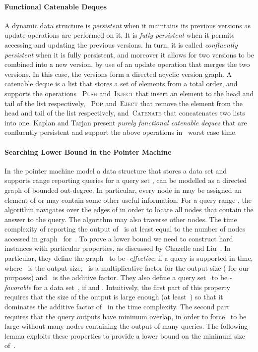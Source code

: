 \documentclass[]{article}
\begin{document}
\paragraph{Functional Catenable Deques}

A dynamic data structure is \textit{persistent} when it maintains its previous
versions as update operations are performed on it. It is \textit{fully
persistent} when it permits accessing and updating the previous versions. In
turn, it is called \textit{confluently persistent} when it is fully persistent,
and moreover it allows for two versions to be combined into a new version, by
use of an update operation that merges the two versions. In this case, the
versions form a directed acyclic version graph. A catenable deque is a list
that stores a set of elements from a total order, and supports the operations
~\textsc{Push} and~\textsc{Inject} that insert an element to the head and tail
of the list respectively, ~\textsc{Pop} and~\textsc{Eject} that remove the
element from the head and tail of the list respectively, and~\textsc{Catenate}
that concatenates two lists into one. Kaplan and Tarjan \cite{KT99} present
\textit{purely functional catenable deques} that are confluently persistent and
support the above operations in~ worst case time.

\paragraph{Searching Lower Bound in the Pointer Machine}

In the pointer machine model a data structure that stores a data set  and
supports range reporting queries for a query set , can be modelled
as a directed graph  of bounded out-degree. In particular, every node in 
may be assigned an element of  or may contain some other useful information.
For a query range , the algorithm navigates over the edges
of  in order to locate all nodes that contain the answer to the query. The
algorithm may also traverse other nodes. The time complexity of reporting the
output of~ is at least equal to the number of nodes accessed in graph~
for~. To prove a lower bound we need to construct hard instances with
particular properties, as discussed by Chazelle and Liu~\cite{C90,CL04}. In
particular, they define the graph~ to be
-\textit{effective}, if a query is supported in  time, where~ is the output size,~ is a multiplicative factor
for the output size ( for our purposes) and~ is the
additive factor. They also define a query set~ to be
-\textit{favorable} for a data set~, if  and . Intuitively, the first part
of this property requires that the size of the output is large enough (at
least~) so that it dominates the additive factor of~ in the time
complexity. The second part requires that the query outputs have minimum
overlap, in order to force~ to be large without many nodes containing the
output of many queries. The following lemma exploits these properties to provide
a lower bound on the minimum size of~.
\end{document}
